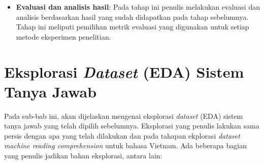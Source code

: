 \begin{itemize}
    \item \textbf{Evaluasi dan analisis hasil}: Pada tahap ini penulis melakukan evaluasi dan analisis berdasarkan hasil yang sudah didapatkan pada tahap sebelumnya. Tahap ini meliputi pemilihan metrik evaluasi yang digunakan untuk setiap metode eksperimen penelitian.

\end{itemize}

\section{Eksplorasi \emph{Dataset} (EDA) Sistem Tanya Jawab}
\label{3.3}
Pada sub-bab ini, akan dijelaskan mengenai eksplorasi \emph{dataset} (EDA) sistem tanya jawab yang telah dipilih sebelumnya. Eksplorasi yang penulis lakukan sama persis dengan apa yang telah dilakukan \citet{nguyen-etal-2020-vietnamese} dan \citet{rajpurkar-etal-2016-squad} pada tahapan ekplorasi \emph{dataset machine reading comprehension} untuk bahasa Vietnam. Ada beberapa bagian yang penulis jadikan bahan eksplorasi, antara lain:

